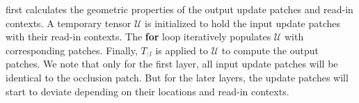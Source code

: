 \begin{algorithm}[t]
\end{algorithm}



 first calculates the geometric properties of the output update patches and read-in contexts. A temporary tensor $\mathcal{U}$ is initialized to hold the input update patches with their read-in contexts. The \textbf{for} loop iteratively populates $\mathcal{U}$ with corresponding patches. Finally, $T_{:l}$ is applied to $\mathcal{U}$ to compute the output patches. We note that only for the first layer, all input update patches will be identical to the occlusion patch. But for the later layers, the update patches will start to deviate depending on their locations and read-in contexts.


